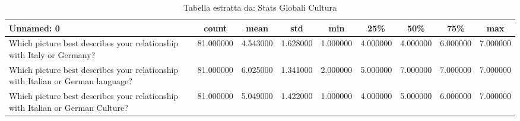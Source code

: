 \begin{table}[htbp]
\caption{Tabella estratta da: Stats Globali Cultura}
\label{tab:stats_globali_cultura}
\begin{tabular}{lcccccccc}
\toprule
Unnamed: 0 & count & mean & std & min & 25\% & 50\% & 75\% & max \\
\midrule
Which picture best describes your relationship with Italy or Germany? & 81.000000 & 4.543000 & 1.628000 & 1.000000 & 4.000000 & 4.000000 & 6.000000 & 7.000000 \\
Which picture best describes your relationship with Italian or German language? & 81.000000 & 6.025000 & 1.341000 & 2.000000 & 5.000000 & 7.000000 & 7.000000 & 7.000000 \\
Which picture best describes your relationship with Italian or German Culture? & 81.000000 & 5.049000 & 1.422000 & 1.000000 & 4.000000 & 5.000000 & 6.000000 & 7.000000 \\
\bottomrule
\end{tabular}
\end{table}
